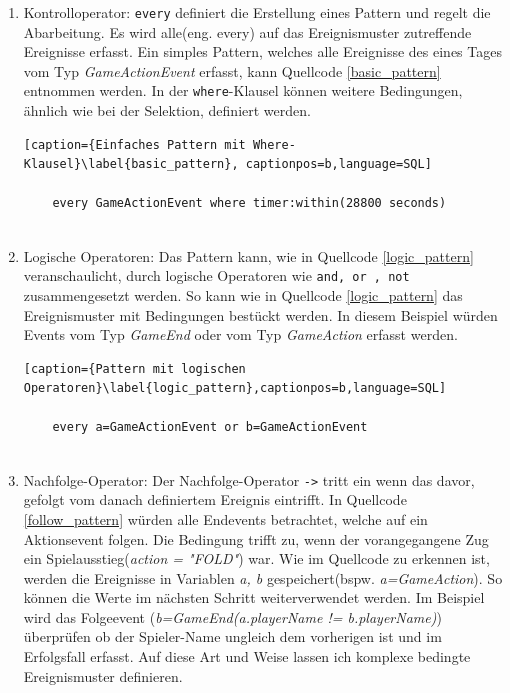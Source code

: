 \begin{enumerate}
	\item Kontrolloperator: \texttt{every} definiert die Erstellung eines Pattern und regelt die Abarbeitung. Es wird alle(eng. every) auf das Ereignismuster zutreffende Ereignisse erfasst. Ein simples Pattern, welches alle Ereignisse des eines Tages vom Typ \textit{GameActionEvent} erfasst, kann Quellcode \ref{basic_pattern} entnommen werden.
	In der \texttt{where}-Klausel können weitere Bedingungen, ähnlich wie bei der Selektion, definiert werden.
	
	\begin{lstlisting}[caption={Einfaches Pattern mit Where-Klausel}\label{basic_pattern}, captionpos=b,language=SQL]
	
	every GameActionEvent where timer:within(28800 seconds)
	
	\end{lstlisting}
	
	\item Logische Operatoren: 
	Das Pattern kann, wie in Quellcode \ref{logic_pattern} veranschaulicht, durch logische Operatoren wie \texttt{and, or , not} zusammengesetzt werden. So kann wie in Quellcode \ref{logic_pattern} das Ereignismuster mit Bedingungen bestückt werden. In diesem Beispiel würden Events vom Typ \textit{GameEnd} oder vom Typ \textit{GameAction} erfasst werden.
	
	\begin{lstlisting}[caption={Pattern mit logischen Operatoren}\label{logic_pattern},captionpos=b,language=SQL]
	
	every a=GameActionEvent or b=GameActionEvent
	
	\end{lstlisting}
	
	\item Nachfolge-Operator:
	Der Nachfolge-Operator \texttt{->} tritt ein wenn das davor, gefolgt vom danach definiertem Ereignis eintrifft. In Quellcode \ref{follow_pattern}  würden alle Endevents betrachtet, welche auf ein Aktionsevent folgen. Die Bedingung trifft zu, wenn der vorangegangene Zug ein Spielausstieg(\textit{action = "FOLD"}) war.
	Wie im Quellcode zu erkennen ist, werden die Ereignisse in Variablen \textit{a, b} gespeichert(bspw. \textit{a=GameAction}). So können die Werte im nächsten Schritt weiterverwendet werden. Im Beispiel wird das Folgeevent (\textit{b=GameEnd(a.playerName != b.playerName)}) überprüfen ob der Spieler-Name ungleich dem vorherigen ist und im Erfolgsfall erfasst. Auf diese Art und Weise lassen ich komplexe bedingte Ereignismuster definieren.
	

\end{enumerate}
